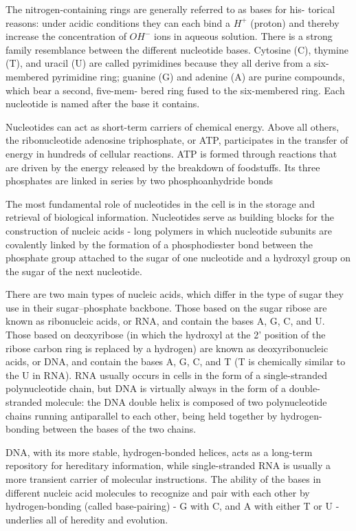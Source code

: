 The nitrogen-containing rings are generally referred to as bases for his-
torical reasons: under acidic conditions they can each bind a $H^{+}$ (proton)
and thereby increase the concentration of $OH^{-}$ ions in aqueous solution.
There is a strong family resemblance between the different nucleotide
bases. Cytosine (C), thymine (T), and uracil (U) are called pyrimidines
because they all derive from a six-membered pyrimidine ring; guanine (G)
and adenine (A) are purine compounds, which bear a second, five-mem-
bered ring fused to the six-membered ring. Each nucleotide is named
after the base it contains.

Nucleotides can act as short-term carriers of chemical energy. Above all
others, the ribonucleotide adenosine triphosphate, or ATP,
participates in the transfer of energy in hundreds of cellular reactions.
ATP is formed through reactions that are driven by the energy released by
the breakdown of foodstuffs. Its three phosphates are linked in series by
two phosphoanhydride bonds

The most fundamental role of nucleotides in the cell is in the storage and
retrieval of biological information. Nucleotides serve as building blocks
for the construction of nucleic acids - long polymers in which nucleotide
subunits are covalently linked by the formation of a phosphodiester bond
between the phosphate group attached to the sugar of one nucleotide
and a hydroxyl group on the sugar of the next nucleotide.

There are two main types of nucleic acids, which differ in the type of
sugar they use in their sugar–phosphate backbone. Those based on the
sugar ribose are known as ribonucleic acids, or RNA, and contain the
bases A, G, C, and U. Those based on deoxyribose (in which the hydroxyl
at the 2' position of the ribose carbon ring is replaced by a hydrogen)
are known as deoxyribonucleic acids, or DNA, and contain the bases A, G, C, and T
(T is chemically similar to the U in RNA).
RNA usually occurs in cells in the form of a single-stranded polynucleotide chain,
but DNA is virtually always in the form
of a double-stranded molecule: the DNA double helix is composed of
two polynucleotide chains running antiparallel to each other, being held
together by hydrogen-bonding between the bases of the two chains.

DNA, with its more stable, hydrogen-bonded
helices, acts as a long-term repository for hereditary information, while
single-stranded RNA is usually a more transient carrier of molecular
instructions. The ability of the bases in different nucleic acid molecules
to recognize and pair with each other by hydrogen-bonding (called base-pairing)
- G with C, and A with either T or U - underlies all of heredity and
evolution.

